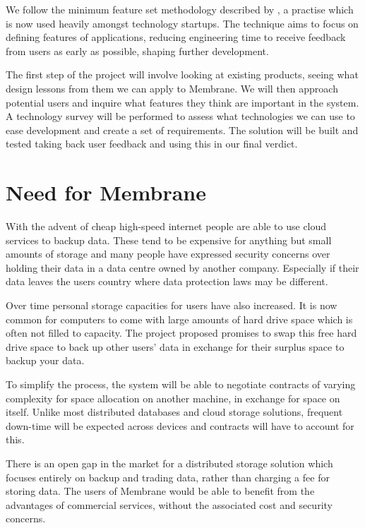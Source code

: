 \documentclass[11pt, a4paper, twoside]{report}
\begin{document}
We follow the minimum feature set methodology described by \cite{blank2010mfs}, a practise which is now used heavily amongst technology startups. The technique aims to focus on defining features of applications, reducing engineering time to receive feedback from users as early as possible, shaping further development.

The first step of the project will involve looking at existing products, seeing what design lessons from them we can apply to Membrane. We will then approach potential users and inquire what features they think are important in the system. A technology survey will be performed to assess what technologies we can use to ease development and create a set of requirements. The solution will be built and tested taking back user feedback and using this in our final verdict.

\section{Need for Membrane}

With the advent of cheap high-speed internet people are able to use cloud services to backup data. These tend to be expensive for anything but small amounts of storage and many people have expressed security concerns over holding their data in a data centre owned by another company. \citep{batters2010dbsecurity} Especially if their data leaves the users country where data protection laws may be different.

Over time personal storage capacities for users have also increased. It is now common for computers to come with large amounts of hard drive space which is often not filled to capacity. The project proposed promises to swap this free hard drive space to back up other users’ data in exchange for their surplus space to backup your data.

To simplify the process, the system will be able to negotiate contracts of varying complexity for space allocation on another machine, in exchange for space on itself. Unlike most distributed databases and cloud storage solutions, frequent down-time will be expected across devices and contracts will have to account for this.

There is an open gap in the market for a distributed storage solution which focuses entirely on backup and trading data, rather than charging a fee for storing data. The users of Membrane would be able to benefit from the advantages of commercial services, without the associated cost and security concerns.
\end{document}
